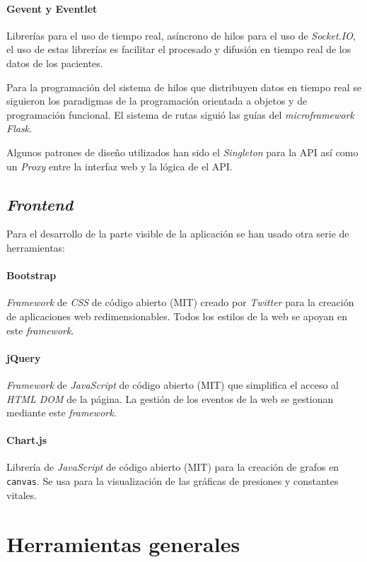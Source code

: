 \paragraph{Gevent y Eventlet~\cite{tool:eventlet, tool:gevent}}Librerías para el uso de tiempo real, asíncrono de hilos para el uso de \textit{Socket.IO}, el uso de estas librerías es facilitar el procesado y difusión en tiempo real de los datos de los pacientes. 

Para la programación del sistema de hilos que distribuyen datos en tiempo real se siguieron los paradigmas de la programación orientada a objetos y de programación funcional. El sistema de rutas siguió las guías del \textit{microframework Flask}. 

Algunos patrones de diseño utilizados han sido el \textit{Singleton} para la API así como un \textit{Proxy} entre la interfaz web y la lógica de el API.

\subsection{\textit{Frontend}}

Para el desarrollo de la parte visible de la aplicación se han usado otra serie de herramientas:
\paragraph{Bootstrap~\cite{wiki:boostrap}}\textit{Framework} de \textit{CSS} de código abierto (MIT) creado por \textit{Twitter} para la creación de aplicaciones web redimensionables. Todos los estilos de la web se apoyan en este \textit{framework}.
\paragraph{jQuery~\cite{wiki:jquery}}\textit{Framework} de \textit{JavaScript} de código abierto (MIT) que simplifica el acceso al \textit{HTML DOM} de la página. La gestión de los eventos de la web se gestionan mediante este \textit{framework}.
\paragraph{Chart.js}Librería de \textit{JavaScript} de código abierto (MIT) para la creación de grafos en \texttt{canvas}. Se usa para la visualización de las gráficas de presiones y constantes vitales.

\section{Herramientas generales}

